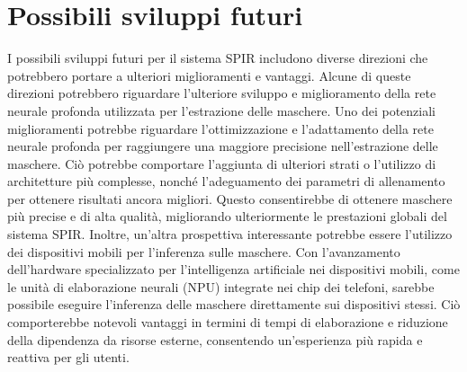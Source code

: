 \documentclass[a4paper,12pt]{report}
\begin{document}
  \section{Possibili sviluppi futuri}
  I possibili sviluppi futuri per il sistema SPIR includono diverse direzioni che potrebbero portare a ulteriori miglioramenti e vantaggi. Alcune di queste direzioni potrebbero riguardare l'ulteriore sviluppo e miglioramento della rete neurale profonda utilizzata per l'estrazione delle maschere.
  Uno dei potenziali miglioramenti potrebbe riguardare l'ottimizzazione e l'adattamento della rete neurale profonda per raggiungere una maggiore precisione nell'estrazione delle maschere. Ciò potrebbe comportare l'aggiunta di ulteriori strati o l'utilizzo di architetture più complesse, nonché l'adeguamento dei parametri di allenamento per ottenere risultati ancora migliori. Questo consentirebbe di ottenere maschere più precise e di alta qualità, migliorando ulteriormente le prestazioni globali del sistema SPIR.
  Inoltre, un'altra prospettiva interessante potrebbe essere l'utilizzo dei dispositivi mobili per l'inferenza sulle maschere. Con l'avanzamento dell'hardware specializzato per l'intelligenza artificiale nei dispositivi mobili, come le unità di elaborazione neurali (NPU) integrate nei chip dei telefoni, sarebbe possibile eseguire l'inferenza delle maschere direttamente sui dispositivi stessi. Ciò comporterebbe notevoli vantaggi in termini di tempi di elaborazione e riduzione della dipendenza da risorse esterne, consentendo un'esperienza più rapida e reattiva per gli utenti.

  
  
\end{document}
